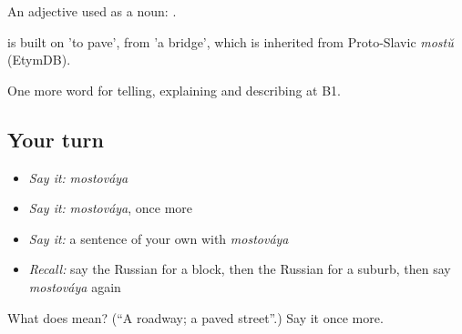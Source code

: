 An adjective used as a noun: \emph{ }.

\begin{cousinweb}
\emph{} is built on \emph{} 'to pave', from \emph{} 'a bridge', which is inherited from Proto-Slavic \emph{mostŭ} (EtymDB).
\end{cousinweb}

\begin{grammarlens}[title={What you've built}]
One more word for telling, explaining and describing at B1.
\end{grammarlens}

\subsection*{Your turn}
\begin{itemize}
\raggedright
  \item \emph{Say it:} \emph{mostováya}
  \item \emph{Say it:} \emph{mostováya}, once more
  \item \emph{Say it:} a sentence of your own with \emph{mostováya}
  \item \emph{Recall:} say the Russian for a block, then the Russian for a suburb, then say \emph{mostováya} again
\end{itemize}

\begin{tcolorbox}[breakable,colback=teal!4,colframe=teal!35!black,title={Before you move on}]
What does  mean? (\textquotedblleft{}A roadway; a paved street\textquotedblright{}.) Say it once more.
\end{tcolorbox}
